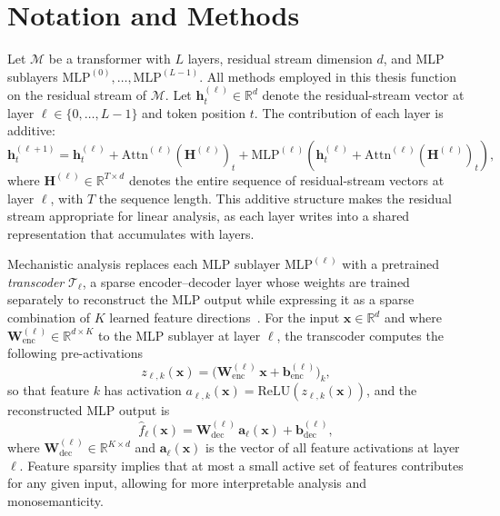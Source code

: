 \section{Notation and Methods}
\label{sec:interp-methods}
Let $\mathcal{M}$ be a transformer with $L$ layers, residual stream dimension $d$, and MLP
sublayers $\mathrm{MLP}^{(0)}, \ldots, \mathrm{MLP}^{(L-1)}$.  All methods employed in this
thesis function on the residual stream of $\mathcal{M}$.  Let $\mathbf{h}^{(\ell)}_t \in \mathbb{R}^d$
denote the residual-stream vector at layer $\ell \in \{0, \ldots, L{-}1\}$ and token position $t$.
The contribution of each layer is additive:
\begin{equation}
    \mathbf{h}^{(\ell+1)}_t = \mathbf{h}^{(\ell)}_t
      + \mathrm{Attn}^{(\ell)}\!\left(\mathbf{H}^{(\ell)}\right)_t
      + \mathrm{MLP}^{(\ell)}\!\left(\mathbf{h}^{(\ell)}_t + \mathrm{Attn}^{(\ell)}\!\left(\mathbf{H}^{(\ell)}\right)_t\right),
    \label{eq:residual}
\end{equation}
where $\mathbf{H}^{(\ell)} \in \mathbb{R}^{T \times d}$ denotes the entire sequence of residual-stream
vectors at layer $\ell$, with $T$ the sequence length.
This additive structure makes the residual stream appropriate for linear analysis, as each
layer writes into a shared representation that accumulates with layers.

Mechanistic analysis replaces each MLP sublayer $\mathrm{MLP}^{(\ell)}$ with a pretrained
\textit{transcoder} $\mathcal{T}_\ell$, a sparse encoder--decoder layer whose weights are trained separately 
to reconstruct the MLP output while expressing it as a sparse combination of \(K\) learned feature directions~\citep{bricken2023monosemanticity, cunningham2023sparse}.  
For the input $\mathbf{x} \in \mathbb{R}^d$ and where $\mathbf{W}_\mathrm{enc}^{(\ell)} \in \mathbb{R}^{d \times K}$  to the MLP sublayer at layer $\ell$, the transcoder computes
the following pre-activations
\begin{equation}
  z_{\ell,k}(\mathbf{x})
    = \bigl(\mathbf{W}_\mathrm{enc}^{(\ell)}\,\mathbf{x}
           + \mathbf{b}_\mathrm{enc}^{(\ell)}\bigr)_k,
  \label{eq:preact}
\end{equation}
so that feature $k$ has activation
$a_{\ell,k}(\mathbf{x}) = \mathrm{ReLU}(z_{\ell,k}(\mathbf{x}))$,
and the reconstructed MLP output is
\begin{equation}
  \hat{f}_\ell(\mathbf{x})
    = \mathbf{W}_\mathrm{dec}^{(\ell)}\,\mathbf{a}_\ell(\mathbf{x})
    + \mathbf{b}_\mathrm{dec}^{(\ell)},
  \label{eq:recon}
\end{equation}
where $\mathbf{W}_\mathrm{dec}^{(\ell)} \in \mathbb{R}^{K \times d}$ and
$\mathbf{a}_\ell(\mathbf{x})$ is the vector of all feature activations at layer $\ell$.
Feature sparsity implies that at most a
small active set of features contributes for any given input, allowing for more interpretable analysis and monosemanticity.

